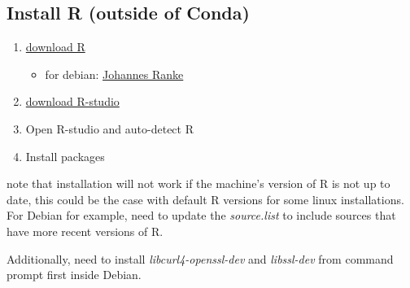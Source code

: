 \documentclass[]{article}
\providecommand{\tightlist}{%
  \setlength{\itemsep}{0pt}\setlength{\parskip}{0pt}}
\begin{document}
\hypertarget{install-r-outside-of-conda}{%
\subsection{Install R (outside of
Conda)}\label{install-r-outside-of-conda}}

\begin{enumerate}
\def\labelenumi{\arabic{enumi}.}
\tightlist
\item
  \href{https://cloud.r-project.org/}{download R}

  \begin{itemize}
  \tightlist
  \item
    for debian:
    \href{https://cran.r-project.org/bin/linux/debian/}{Johannes Ranke}
  \end{itemize}
\item
  \href{https://rstudio.com/products/rstudio/download/}{download
  R-studio}
\item
  Open R-studio and auto-detect R
\item
  Install packages
\end{enumerate}

note that installation will not work if the machine's version of R is
not up to date, this could be the case with default R versions for some
linux installations. For Debian for example, need to update the
\emph{source.list} to include sources that have more recent versions of
R.

Additionally, need to install \emph{libcurl4-openssl-dev} and
\emph{libssl-dev} from command prompt first inside Debian.
\end{document}
